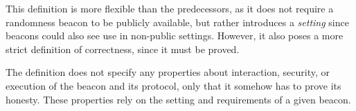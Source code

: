 This definition is more flexible than the predecessors, as it does not require a randomness beacon to be publicly available, but rather introduces a \emph{setting} since beacons could also see use in non-public settings.
However, it also poses a more strict definition of correctness, since it must be proved.

The definition does not specify any properties about interaction, security, or execution of the beacon and its protocol, only that it somehow has to prove its honesty.
These properties rely on the setting and requirements of a given beacon.

